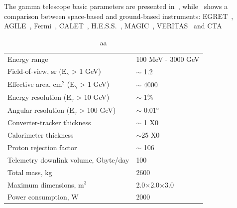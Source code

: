 The \gls{gamma} telescope basic parameters are presented
in~, while~ shows a
comparison between space-based and ground-based instruments:
EGRET~\cite{Thompson:1993zz}, AGILE~\cite{Tavani:2008sp},
Fermi~\cite{Abdo:2009gy}, CALET~\cite{Torii:2008zz},
H.E.S.S.~\cite{Aharonian:2005kn}, MAGIC~\cite{Aleksic:2011bx}, 
VERITAS~\cite{Weekes:2010zz}
 and CTA~\cite{Medina:2011be}
\begin{table}[!htb]
  \begin{center}
    \begin{tabular}{|l|l|}\hline
      Energy range & 100 MeV - 3000 GeV\\
      Field-of-view, sr (E$_\gamma$ > 1 GeV) & $\sim$ 1.2\\
      Effective area, cm$^2$ (E$_\gamma$ > 1 GeV) & $\sim$ 4000\\
      Energy resolution (E$_\gamma$ > 10 GeV) & $\sim$ 1\%\\
      Angular resolution (E$_\gamma$ > 100 GeV) & $\sim$ $0.01\si{\degree}$\\
      Converter-tracker thickness & $\sim$ 1 X0\\
      Calorimeter thickness & $\sim$25 X0\\
      Proton rejection factor & $\sim$ 106\\
      Telemetry downlink volume, Gbyte/day & 100\\
      Total mass, kg & 2600\\
      Maximum dimensions, m$^3$ & 2.0$\times$2.0$\times$3.0\\
      Power consumption, W & 2000\\
\hline
    \end{tabular}
    \caption{aa}\label{tab:gamma400_info}
  \end{center}
\end{table}
